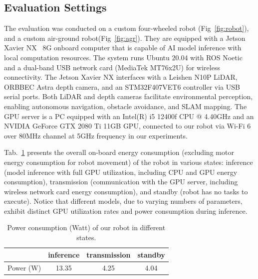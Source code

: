 \subsection{Evaluation Settings}
The evaluation was conducted on a custom four-wheeled robot (Fig~\ref{fig:robot}), and a custom air-ground robot(Fig~\ref{fig:agr}).
They are equipped with a Jetson Xavier NX~\cite{jetsonnx} 8G onboard computer that is capable of AI model inference with local computation resources. 
The system runs Ubuntu 20.04 with ROS Noetic and a dual-band USB network card (MediaTek MT76x2U) for wireless connectivity. 
The Jetson Xavier NX interfaces with a Leishen N10P LiDAR, ORBBEC Astra depth camera, and an STM32F407VET6 controller via USB serial ports. 
Both LiDAR and depth cameras facilitate environmental perception, enabling autonomous navigation, obstacle avoidance, and SLAM mapping. 
The GPU server is a PC equipped with an Intel(R) i5 12400f CPU @ 4.40GHz and an NVIDIA GeForce GTX 2080 Ti 11GB GPU, connected to our robot via Wi-Fi 6 over 80MHz channel at 5GHz frequency in our experiments.

Tab.~\ref{tab:energydefault} presents the overall on-board energy consumption (excluding motor energy consumption for robot movement) of the robot in various states: inference (model inference with full GPU utilization, including CPU and GPU energy consumption), transmission (communication with the GPU server, including wireless network card energy consumption), and standby (robot has no tasks to execute).
Notice that different models, due to varying numbers of parameters, exhibit distinct GPU utilization rates and power consumption during inference. 

\begin{table}[!t]
    \centering
    \begin{tabular}{|c|c|c|c|}
    \hline
            & inference & transmission & standby \\ \hline
    Power (W) &     13.35        &       4.25        &    4.04   \\ \hline
    \end{tabular}
    \caption{Power consumption (Watt) of our robot in different states.}
    \label{tab:energydefault}
    \end{table}


